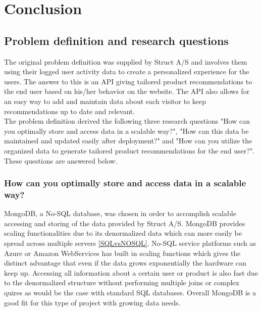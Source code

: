 
\chapter{Conclusion} %

\label{Chapter8} %


\section{Problem definition and research questions}

The original problem definition was supplied by Struct A/S and involves them using their logged user activity data to create a personalized experience for the users. The answer to this is an API giving tailored product recommendations to the end user based on his/her behavior on the website. The API also allows for an easy way to add and maintain data about each visitor to keep recommendations up to date and relevant. \\
The problem definition derived the following three research questions "How can you optimally store and access data in a scalable way?",  "How can this data be maintained and updated easily after deployment?" and "How can you utilize the organized data to generate tailored product recommendations for the end user?". These questions are answered below.

\subsection{How can you optimally store and access data in a scalable way?}
MongoDB, a No-SQL database, was chosen in order to accomplish scalable accessing and storing of the data provided by Struct A/S. MongoDB provides scaling functionalities due to its denormalized data which can more easily be spread across multiple servers \ref{SQLvsNOSQL}. No-SQL service platforms such as Azure or Amazon WebServices has built in scaling functions \cite{azureNoSQL} which gives the distinct advantage that even if the data grows exponentially the hardware can keep up. Accessing all information about a certain user or product is also fast due to the denormalized structure without performing multiple joins or complex quires as would be the case with standard SQL databases. Overall MongoDB is a good fit for this type of project with growing data needs.

